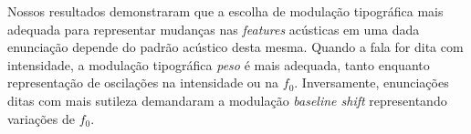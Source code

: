 \documentclass[11pt]{article}
\begin{document}
  Nossos resultados demonstraram que a escolha de modulação tipográfica mais adequada para representar mudanças nas {\itshape features} acústicas em uma dada enunciação depende do padrão acústico desta mesma. Quando a fala for dita com intensidade, a modulação tipográfica {\itshape peso} é mais adequada, tanto enquanto representação de oscilações na intensidade ou na $f_0$. Inversamente, enunciações ditas com mais sutileza demandaram a modulação {\itshape baseline shift} representando variações de $f_0$.

  

   
\end{document}
